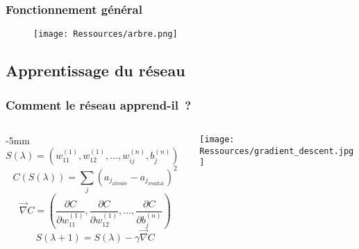 \documentclass{beamer}
\begin{document}
  \begin{frame}
    \frametitle{Fonctionnement général}
    \begin{figure}
      \texttt{[image: Ressources/arbre.png]}
    \end{figure}
  \end{frame}

  \subsection{Apprentissage du réseau}
  \begin{frame}
    \frametitle{Comment le réseau apprend-il~?}
      \begin{columns}
        \begin{column}{\dimexpr\linewidth-3cm-5mm}
          \[
            S(\lambda) = \left(w^{(1)}_{11}, w^{(1)}_{12}, \dots, w^{(n)}_{ij}, b^{(n)}_{j}\right) \quad\text{à l'étape $\lambda$}
          \]
          \[
            C(S(\lambda))
            = \sum_{j} \left(a_{j_{\text{attente}}} - a_{j_{\text{résultat}}}\right)^2
          \]
          \[
            \vec\nabla C = \left(\frac{\partial C}{\partial w_{11}^{(1)}}, \frac{\partial C}{\partial w_{12}^{(1)}}, \dots, \frac{\partial C}{\partial b_{j}^{(n)}}\right)
          \]
          \[
            S(\lambda + 1) = S(\lambda) - \gamma\vec\nabla C
          \]
        \end{column}
        \begin{column}{5cm}
            \texttt{[image: Ressources/gradient\_descent.jpg]}
        \end{column}
      \end{columns}
  \end{frame}
\end{document}
